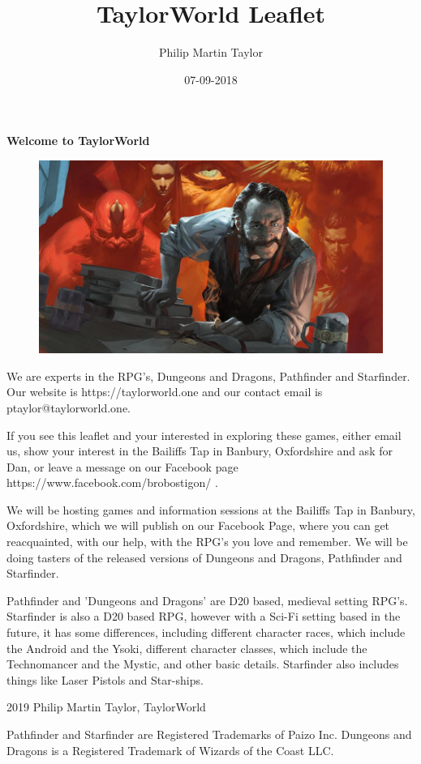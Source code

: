 \documentclass[12pt,a4paper]{book}
\date{07-09-2018}
\author{Philip Martin Taylor}
\title{TaylorWorld Leaflet}
\begin{document}
 
\begin{center} 
\textbf{Welcome to TaylorWorld\texttrademark} 
\end{center} 
\begin{figure}[h]
  \centering
  \includegraphics[scale=0.15]{alchemist.jpg}
\end{figure}
\begin{flushleft} We are experts in the RPG's, Dungeons and Dragons, Pathfinder and Starfinder. Our website is https://taylorworld.one and our contact email is ptaylor@taylorworld.one. 
\end{flushleft} 
\begin{flushleft}
  If you see this leaflet and your interested in exploring these games, either email us, show your interest in the Bailiffs Tap in Banbury, Oxfordshire and ask for Dan, or leave a message on our Facebook page https://www.facebook.com/brobostigon/ . 
\end{flushleft} 
\begin{flushleft}
 We will be hosting games and information sessions at the Bailiffs Tap in Banbury, Oxfordshire, which we will publish on our Facebook Page, 
where you can get reacquainted, with our help, with the RPG's you love and remember. We will be doing tasters of the released versions of Dungeons and Dragons, Pathfinder and Starfinder. 
\end{flushleft} 
\begin{flushleft}
  Pathfinder and 'Dungeons and Dragons' are D20 based, medieval setting RPG's. Starfinder is also a D20 based RPG, however with a Sci-Fi setting based in the future, it has some differences, including different character races, which include the Android and the Ysoki, different character 
classes, which include the Technomancer and the Mystic, and other basic details. Starfinder also includes things like Laser Pistols and 
Star-ships. 
\end{flushleft} 
\begin{center}
  \textcopyright{} 2019 Philip Martin Taylor, TaylorWorld
\end{center} 
\begin{center}
  Pathfinder and Starfinder are Registered Trademarks of Paizo Inc. Dungeons and Dragons is a Registered Trademark of Wizards of 
the Coast LLC. 
\end{center}
\end{document}
